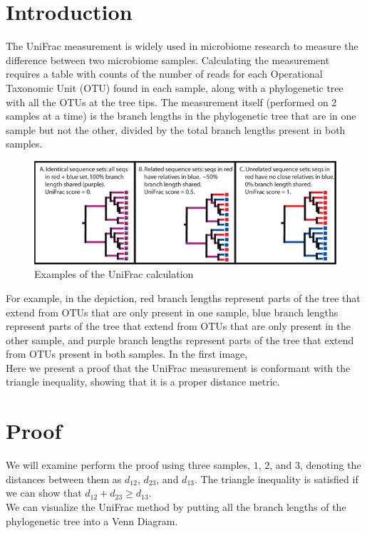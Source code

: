 \documentclass[10pt,letterpaper]{article}
\begin{document}
\linenumbers
\section*{Introduction}
The UniFrac measurement is widely used in microbiome research to measure the difference between two microbiome samples. Calculating the measurement requires a table with counts of the number of reads for each Operational Taxonomic Unit (OTU) found in each sample, along with a phylogenetic tree with all the OTUs at the tree tips. The measurement itself (performed on 2 samples at a time) is the branch lengths in the phylogenetic tree that are in one sample but not the other, divided by the total branch lengths present in both samples.\\[3ex]

\begin{figure}[h!]
  \centering
  \caption{Examples of the UniFrac calculation}
    \includegraphics[width=80ex]{unifrac_test.jpg}
\end{figure}

For example, in the depiction, red branch lengths represent parts of the tree that extend from OTUs that are only present in one sample, blue branch lengths represent parts of the tree that extend from OTUs that are only present in the other sample, and purple branch lengths represent parts of the tree that extend from OTUs present in both samples. In the first image, \\
Here we present a proof that the UniFrac measurement is conformant with the triangle inequality, showing that it is a proper distance metric.

\section*{Proof}

We will examine perform the proof using three samples, $1$, $2$, and $3$, denoting the distances between them as $d_12$, $d_23$, and $d_13$. The triangle inequality is satisfied if we can show that $d_12 + d_23 \ge d_13$.\\
We can visualize the UniFrac method by putting all the branch lengths of the phylogenetic tree into a Venn Diagram.
\end{document}
